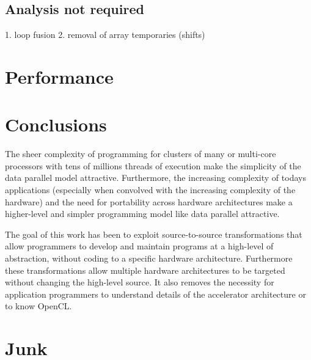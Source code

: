 \documentclass[10pt, conference, compsocconf]{IEEEtran}
\begin{document}
\subsection{Analysis not required}

1. loop fusion
2. removal of array temporaries (shifts)

\section{Performance}

\section{Conclusions}


The sheer complexity of programming for clusters of many or multi-core
processors with tens of millions threads of execution make the simplicity of
the data parallel model attractive.  Furthermore, the increasing complexity of
todays applications (especially when convolved with the increasing complexity
of the hardware) and the need for portability across hardware architectures
make a higher-level and simpler programming model like data parallel
attractive.

The goal of this work has been to exploit source-to-source transformations that
allow programmers to develop and maintain programs at a high-level of
abstraction, without coding to a specific hardware architecture.
Furthermore these transformations allow multiple hardware architectures
to be targeted without changing the high-level source.  It also removes the
necessity for application programmers to understand details of the accelerator
architecture or to know OpenCL.



\section{Junk}

\cite{chamberlain04zpl, roth97stencils}



\end{document}
